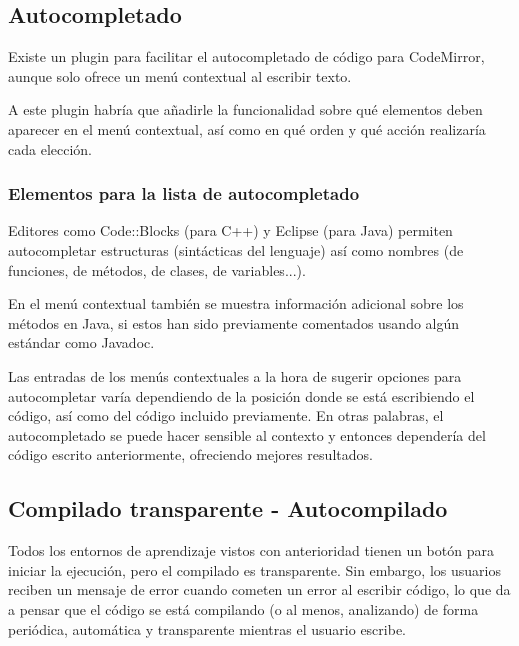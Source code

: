 \documentclass{report}
\begin{document}
	\subsection{Autocompletado}
	
	Existe un plugin para facilitar el autocompletado de código para CodeMirror, aunque solo ofrece un menú contextual al escribir texto. 
	
	\vspace{10px}
	
	A este plugin habría que añadirle la funcionalidad sobre qué elementos deben aparecer en el menú contextual, así como en qué orden y qué acción realizaría cada elección.
	
	\subsubsection{Elementos para la lista de autocompletado}
	
	Editores como Code::Blocks (para C++) y Eclipse (para Java) permiten autocompletar estructuras (sintácticas del lenguaje) así como nombres (de funciones, de métodos, de clases, de variables...).
	
	\vspace{10px}
	
	En el menú contextual también se muestra información adicional sobre los métodos en Java, si estos han sido previamente comentados usando algún estándar como Javadoc\cite{javadoc}.
	
	\vspace{10px}
	
	Las entradas de los menús contextuales a la hora de sugerir opciones para autocompletar varía dependiendo de la posición donde se está escribiendo el código, así como del código incluido previamente. En otras palabras, el autocompletado se puede hacer sensible al contexto y entonces dependería del código escrito anteriormente, ofreciendo mejores resultados.
	
	\subsection{Compilado transparente - Autocompilado}
	
	Todos los entornos de aprendizaje vistos con anterioridad tienen un botón para iniciar la ejecución, pero el compilado es transparente. Sin embargo, los usuarios reciben un mensaje de error cuando cometen un error al escribir código, lo que da a pensar que el código se está compilando (o al menos, analizando) de forma periódica, automática y transparente mientras el usuario escribe. 
	
\end{document}
